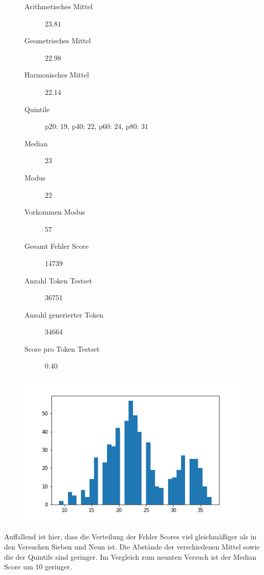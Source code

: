 \documentclass[pdftex,a4paper,halfparskip, article]{scrartcl}
\begin{document}
\begin{figure}
\centering
\begin{minipage}{.5\textwidth}
  \centering
  \begin{description}
	\item[Arithmetisches Mittel] $23.81$	
	\item[Geometrisches Mittel] $22.98$
	\item[Harmonisches Mittel] $22.14$
	\item[Quintile] p20: $19$, p40: $22$, p60: $24$, p80: $31$
	\item[Median] $23$
	\item[Modus] $22$
	\item[Vorkommen Modus] $57$
	\item[Gesamt Fehler Score] 14739
	\item[Anzahl Token Testset] 36751 
	\item[Anzahl generierter Token] 34664
	\item[Score pro Token Testset]  0.40
\end{description}
  \label{fig:lage_bin13}
\end{minipage}%
\begin{minipage}{.5\textwidth}
  \centering
  \includegraphics[width=1\linewidth]{predictions_bin13_histogramm}
  \label{fig:hist_bin13}
\end{minipage}
\end{figure}

Auffallend ist hier, dass die Verteilung der Fehler Scores viel gleichmäßiger als in den Versuchen Sieben und Neun ist. Die Abstände der verschiedenen Mittel sowie die der Quintile sind geringer. Im Vergleich zum neunten Versuch ist der Median Score um 10 geringer. 
\end{document}
